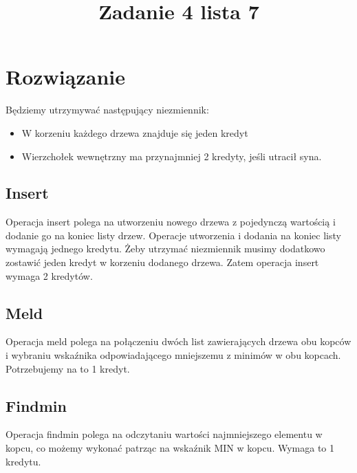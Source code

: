\documentclass{article}
\title{Zadanie 4 lista 7}
\begin{document}
\maketitle

\tableofcontents

\section{Rozwiązanie}
Będziemy utrzymywać następujący niezmiennik:
\begin{itemize}
    \item W korzeniu każdego drzewa znajduje się jeden kredyt
    \item Wierzchołek wewnętrzny ma przynajmniej 2 kredyty, jeśli utracił syna.
\end{itemize}

\subsection{Insert}
Operacja insert polega na utworzeniu nowego drzewa z pojedynczą wartością i dodanie go na koniec listy drzew. Operacje utworzenia i dodania na koniec listy wymagają jednego kredytu. Żeby utrzymać niezmiennik musimy dodatkowo zostawić jeden kredyt w korzeniu dodanego drzewa. Zatem operacja insert wymaga 2 kredytów.

\subsection{Meld}
Operacja meld polega na połączeniu dwóch list zawierających drzewa obu kopców i wybraniu wskaźnika odpowiadającego mniejszemu z minimów w obu kopcach. Potrzebujemy na to 1 kredyt.

\subsection{Findmin}
Operacja findmin polega na odczytaniu wartości najmniejszego elementu w kopcu, co możemy wykonać patrząc na wskaźnik MIN w kopcu. Wymaga to 1 kredytu.
\end{document}
